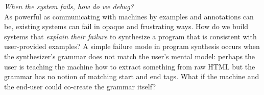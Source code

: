 \documentclass[justified]{tufte-handout}
\begin{document}
\emph{When the system fails, how do we debug?}\\
\noindent
As powerful as communicating with machines by examples and annotations can be, existing systems can fail in opaque and frustrating ways. How do we build systems that \emph{explain their failure} to synthesize a program that is consistent with user-provided examples? A simple failure mode in program synthesis occurs when the synthesizer's grammar does not match the user's mental model: perhaps the user is teaching the machine how to extract something from raw HTML but the grammar has no notion of matching start and end tags. %
What if the machine and the end-user could co-create the grammar itself?



\end{document}
